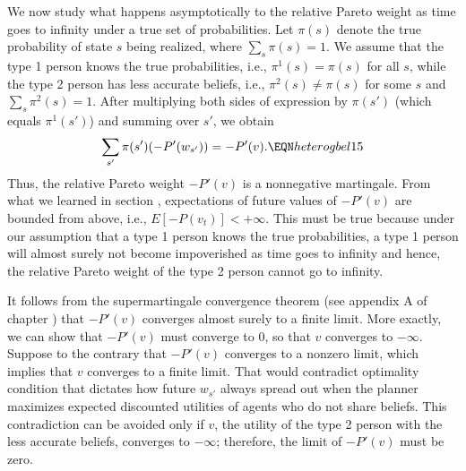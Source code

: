 We now study what happens asymptotically to the relative
Pareto weight as time goes to
infinity under a true set of probabilities.
Let $\pi(s)$ denote the true probability of 
state $s$ being realized, where 
$\sum_{s} \pi(s) =1$. We assume that 
the type 1 person knows the true probabilities, 
i.e., $\pi^1(s)=\pi(s)$ for all $s$, while
the type 2 person has less accurate beliefs, i.e.,
$\pi^2(s) \neq \pi(s)$ for some $s$ and
$\sum_{s} \pi^2(s) =1$. After multiplying both sides 
of expression  by $\pi(s')$
(which equals $\pi^1(s')$) and summing over $s'$, 
we obtain
$$
\sum_{s'} \pi(s') (-P'(w_{s'})) = -P'(v) .    
                             \EQN heterogbel15 $$
Thus, the relative Pareto weight $-P'(v)$ is 
a nonnegative martingale. From what we 
learned in section ,
expectations of future values of $-P'(v)$ are
bounded from above, i.e., $E[-P(v_t)]<+\infty$.
This must be true because under our assumption that
a type 1 person knows the true probabilities,
a  type 1 person will almost surely not become
impoverished  as
time goes to infinity and 
hence, the relative Pareto weight of the 
type 2 person cannot go to infinity.

It follows from the supermartingale convergence
theorem (see appendix A of chapter ) 
that $-P'(v)$ converges almost surely to a finite
limit. More exactly, we can show that $-P'(v)$ must converge 
to $0$, so that $v$ converges to $-\infty$. 
Suppose to the contrary that $-P'(v)$ converges 
to a nonzero limit, which implies that $v$ 
converges to a finite limit. That would
contradict optimality condition 
that dictates how future $w_{s'}$ always 
spread out when the planner maximizes 
expected discounted utilities of agents who
do not share beliefs. This 
contradiction can be avoided only if $v$, the
utility of the type 2 person with the less
accurate beliefs, converges to $-\infty$; 
therefore, the limit of
$-P'(v)$ must be zero.













